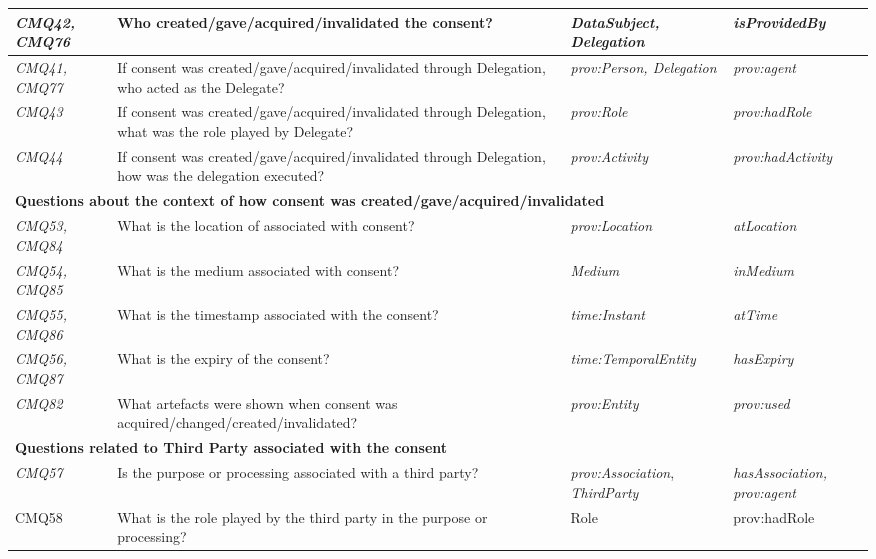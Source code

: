 \begin{table}[htbp]
\begin{tabularx}{\textwidth}{|p{1cm}|X|p{4cm}|p{3.5cm}|}
\textit{CMQ42, CMQ76} & Who created/gave/acquired/invalidated the consent? & \textit{DataSubject, Delegation} & \textit{isProvidedBy} \\ \hline
\textit{CMQ41, CMQ77} & If consent was created/gave/acquired/invalidated through Delegation, who acted as the Delegate? & \textit{prov:Person, Delegation} & \textit{prov:agent} \\ \hline
\textit{CMQ43} & If consent was created/gave/acquired/invalidated through Delegation, what was the role played by Delegate? & \textit{prov:Role} & \textit{prov:hadRole} \\ \hline
\textit{CMQ44} & If consent was created/gave/acquired/invalidated through Delegation, how was the delegation executed? & \textit{prov:Activity} & \textit{prov:hadActivity} \\ \hline
\multicolumn{4}{|l|}{\textbf{Questions about the context of how consent was created/gave/acquired/invalidated}} \\ \hline
\textit{CMQ53, CMQ84} & What is the location of associated with consent? & \textit{prov:Location} & \textit{atLocation} \\ \hline
\textit{CMQ54, CMQ85} & What is the medium associated with consent? & \textit{Medium} & \textit{inMedium} \\ \hline
\textit{CMQ55, CMQ86} & What is the timestamp associated with the consent? & \textit{time:Instant} & \textit{atTime} \\ \hline
\textit{CMQ56, CMQ87} & What is the expiry of the consent? & \textit{time:TemporalEntity} & \textit{hasExpiry} \\ \hline
\textit{CMQ82} & What artefacts were shown when consent was acquired/changed/created/invalidated? & \textit{prov:Entity} & \textit{prov:used} \\ \hline
\multicolumn{4}{|l|}{\textbf{Questions related to Third Party associated with the consent}} \\ \hline
\textit{CMQ57} & Is the purpose or processing associated with a third party? & \textit{prov:Association}, \textit{ThirdParty} & \textit{hasAssociation, prov:agent} \\ \hline
CMQ58 & What is the role played by the third party in the purpose or processing? & Role & prov:hadRole \\ \hline
\end{tabularx}
\end{table}

